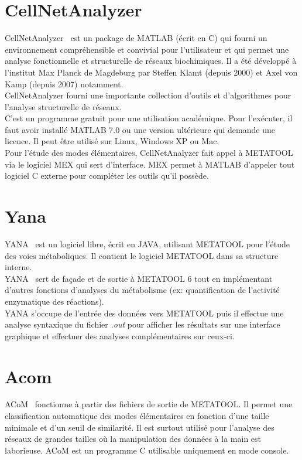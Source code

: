 \section{CellNetAnalyzer}
CellNetAnalyzer~\cite{cna:url} est un package de MATLAB (écrit en \textsc{C}) qui fourni un environnement compréhensible et convivial pour l'utilisateur et qui permet une analyse fonctionnelle et structurelle de réseaux biochimiques. Il a été développé à l'institut Max Planck de Magdeburg par Steffen Klamt (depuis 2000) et Axel von Kamp (depuis 2007) notamment.\\
CellNetAnalyzer fourni une importante collection d'outils et d'algorithmes pour l'analyse structurelle de réseaux.\\
C'est un programme gratuit pour une utilisation académique. Pour l'exécuter, il faut avoir installé MATLAB 7.0 ou une version ultérieure qui demande une licence. Il peut être utilisé sur Linux, Windows XP ou Mac.\\
Pour l'étude des modes élémentaires, CellNetAnalyzer fait appel à METATOOL via le logiciel MEX qui sert d'interface. MEX permet à MATLAB d'appeler tout logiciel \textsc{C} externe pour compléter les outils qu'il possède.

\section{Yana}
YANA~\cite{yana:url} est un logiciel libre, écrit en JAVA, utilisant METATOOL pour l'étude
des voies métaboliques. Il contient le logiciel METATOOL dans sa structure interne. \\
YANA~\cite{yanasq:url} sert de façade et de sortie à METATOOL 6 tout en implémentant d'autres fonctions d'analyses du métabolisme (ex: quantification de l'activité enzymatique des réactions).\\ YANA s'occupe de l'entrée des données vers METATOOL puis il effectue une analyse syntaxique du fichier \textit{.out} pour afficher les résultats sur une interface graphique et effectuer des analyses complémentaires sur ceux-ci.

\section{Acom}
ACoM~\cite{acom:url} fonctionne à partir des fichiers de sortie de METATOOL. Il permet une classification automatique des modes élémentaires en fonction d'une taille minimale et d'un seuil de similarité. Il est surtout utilisé pour l'analyse des réseaux de grandes tailles où la manipulation des données à la main est laborieuse. ACoM est un programme
C utilisable uniquement en mode console.

